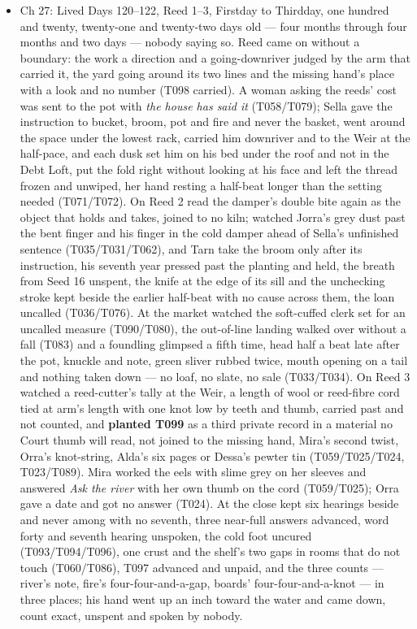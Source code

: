 \documentclass{design/chronicle}
\begin{document}
{\begin{itemize}[leftmargin=1.4em,itemsep=1pt,topsep=3pt,parsep=0pt]
\item Ch 27: Lived Days 120–122, Reed 1–3, Firstday to Thirdday, one hundred and twenty, twenty-one and twenty-two days old — four months through four months and two days — nobody saying so. Reed came on without a boundary: the work a direction and a going-downriver judged by the arm that carried it, the yard going around its two lines and the missing hand’s place with a look and no number (T098 carried). A woman asking the reeds’ cost was sent to the pot with \emph{the house has said it} (T058/T079); Sella gave the instruction to bucket, broom, pot and fire and never the basket, went around the space under the lowest rack, carried him downriver and to the Weir at the half-pace, and each dusk set him on his bed under the roof and not in the Debt Loft, put the fold right without looking at his face and left the thread frozen and unwiped, her hand resting a half-beat longer than the setting needed (T071/T072). On Reed 2 read the damper’s double bite again as the object that holds and takes, joined to no kiln; watched Jorra’s grey dust past the bent finger and his finger in the cold damper ahead of Sella’s unfinished sentence (T035/T031/T062), and Tarn take the broom only after its instruction, his seventh year pressed past the planting and held, the breath from Seed 16 unspent, the knife at the edge of its sill and the unchecking stroke kept beside the earlier half-beat with no cause across them, the loan uncalled (T036/T076). At the market watched the soft-cuffed clerk set for an uncalled measure (T090/T080), the out-of-line landing walked over without a fall (T083) and a foundling glimpsed a fifth time, head half a beat late after the pot, knuckle and note, green sliver rubbed twice, mouth opening on a tail and nothing taken down — no loaf, no slate, no sale (T033/T034). On Reed 3 watched a reed-cutter’s tally at the Weir, a length of wool or reed-fibre cord tied at arm’s length with one knot low by teeth and thumb, carried past and not counted, and \textbf{planted T099} as a third private record in a material no Court thumb will read, not joined to the missing hand, Mira’s second twist, Orra’s knot-string, Alda’s six pages or Dessa’s pewter tin (T059/T025/T024, T023/T089). Mira worked the eels with slime grey on her sleeves and answered \emph{Ask the river} with her own thumb on the cord (T059/T025); Orra gave a date and got no answer (T024). At the close kept six hearings beside and never among with no seventh, three near-full answers advanced, word forty and seventh hearing unspoken, the cold foot uncured (T093/T094/T096), one crust and the shelf’s two gaps in rooms that do not touch (T060/T086), T097 advanced and unpaid, and the three counts — river’s note, fire’s four-four-and-a-gap, boards’ four-four-and-a-knot — in three places; his hand went up an inch toward the water and came down, count exact, unspent and spoken by nobody.


\end{itemize}}
\end{document}
